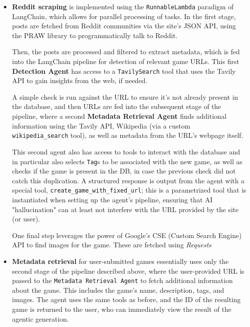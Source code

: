 \documentclass[11pt,italian,a4paper]{article}
\begin{document}
\begin{itemize}
    \item \textbf{Reddit scraping} is implemented using the \texttt{RunnableLambda} paradigm of LangChain, which allows for parallel processing of tasks. In the first stage, posts are fetched from Reddit communities via the site's JSON API, using the PRAW library to programmatically talk to Reddit.

    Then, the posts are processed and filtered to extract metadata, which is fed into the LangChain pipeline for detection of relevant game URLs. This first \textbf{Detection Agent} has access to a \texttt{TavilySearch} tool that uses the Tavily API to gain insights from the web, if needed.

    A simple check is run against the URL to ensure it's not already present in the database, and then URLs are fed into the subsequent stage of the pipeline, where a second \textbf{Metadata Retrieval Agent} finds additional information using the Tavily API, Wikipedia (via a custom \texttt{wikipedia\_search} tool), as well as metadata from the URL's webpage itself.

    This second agent also has access to tools to interact with the database and in particular also selects \texttt{Tag}s to be associated with the new game, as well as checks if the game is present in the DB, in case the previous check did not catch this duplication. A structured response is output from the agent with a special tool, \texttt{create\_game\_with\_fixed\_url}; this is a parametrized tool that is instantiated when setting up the agent's pipeline, ensuring that AI "hallucination" can at least not interfere with the URL provided by the site (or user).

    One final step leverages the power of Google's CSE (Custom Search Engine) API to find images for the game. These are fetched using \textit{Requests}
    \item \textbf{Metadata retrieval} for user-submitted games essentially uses only the second stage of the pipeline described above, where the user-provided URL is passed to the \texttt{Metadata Retrieval Agent} to fetch additional information about the game. This includes the game's name, description, tags, and images. The agent uses the same tools as before, and the ID of the resulting game is returned to the user, who can immediately view the result of the agentic generation.
\end{itemize}
\end{document}
